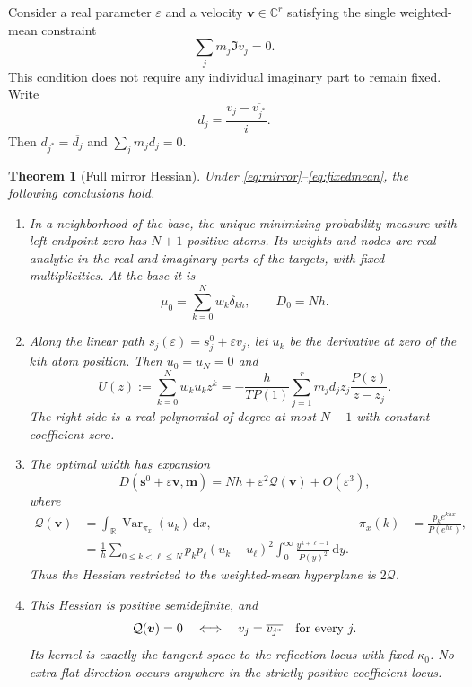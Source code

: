 \documentclass[11pt]{article}
\newtheorem{theorem}{Theorem}[section]
\theoremstyle{remark}\newtheorem{remark}[theorem]{Remark}
\newcommand{\R}{\mathbb R}\newcommand{\C}{\mathbb C}
\newcommand{\dd}{\,\mathrm d}
\DeclareMathOperator{\Var}{Var}
\begin{document}
Consider a real parameter $\varepsilon$ and a velocity $\boldsymbol v\in\C^r$ satisfying the single weighted-mean constraint
\begin{equation}\label{eq:fixedmean}
 \sum_jm_j\Im v_j=0.
\end{equation}
This condition does not require any individual imaginary part to remain fixed. Write
\begin{equation}\label{eq:defectvelocity}
 d_j=\frac{v_j-\overline{v_{j^*}}}{i}.
\end{equation}
Then $d_{j^*}=\overline{d_j}$ and $\sum_jm_jd_j=0$.

\begin{theorem}[Full mirror Hessian]\label{thm:hessian}
Under \eqref{eq:mirror}--\eqref{eq:fixedmean}, the following conclusions hold.
\begin{enumerate}
\item In a neighborhood of the base, the unique minimizing probability measure with left endpoint zero has $N+1$ positive atoms. Its weights and nodes are real analytic in the real and imaginary parts of the targets, with fixed multiplicities. At the base it is
\[
 \mu_0=\sum_{k=0}^Nw_k\delta_{kh},\qquad D_0=Nh.
\]
\item Along the linear path $s_j(\varepsilon)=s_j^0+\varepsilon v_j$, let $u_k$ be the derivative at zero of the $k$th atom position. Then $u_0=u_N=0$ and
\begin{equation}\label{eq:U}
 U(z):=\sum_{k=0}^Nw_ku_kz^k
 =-\frac{h}{T P(1)}\sum_{j=1}^r m_jd_jz_j\frac{P(z)}{z-z_j}.
\end{equation}
The right side is a real polynomial of degree at most $N-1$ with constant coefficient zero.
\item The optimal width has expansion
\begin{equation}\label{eq:expansion}
 D(\boldsymbol s^0+\varepsilon\boldsymbol v,\boldsymbol m)
 =Nh+\varepsilon^2\mathcal Q(\boldsymbol v)+O(\varepsilon^3),
\end{equation}
where
\begin{align}
 \mathcal Q(\boldsymbol v)
 &=\int_{\R}\Var_{\pi_x}(u_k)\dd x,
 &\pi_x(k)&=\frac{p_ke^{khx}}{P(e^{hx})},\label{eq:variance}\\
 &=\frac1h\sum_{0\le k<\ell\le N}p_kp_\ell(u_k-u_\ell)^2
 \int_0^\infty\frac{y^{k+\ell-1}}{P(y)^2}\dd y.\label{eq:gram}
\end{align}
Thus the Hessian restricted to the weighted-mean hyperplane is $2\mathcal Q$.
\item This Hessian is positive semidefinite, and
\begin{equation}\label{eq:kernel}
 \mathcal Q(\boldsymbol v)=0
 \quad\Longleftrightarrow\quad
 v_j=\overline{v_{j^*}}\quad\hbox{for every }j.
\end{equation}
Its kernel is exactly the tangent space to the reflection locus with fixed $\kappa_0$. No extra flat direction occurs anywhere in the strictly positive coefficient locus.
\end{enumerate}
\end{theorem}
\end{document}
